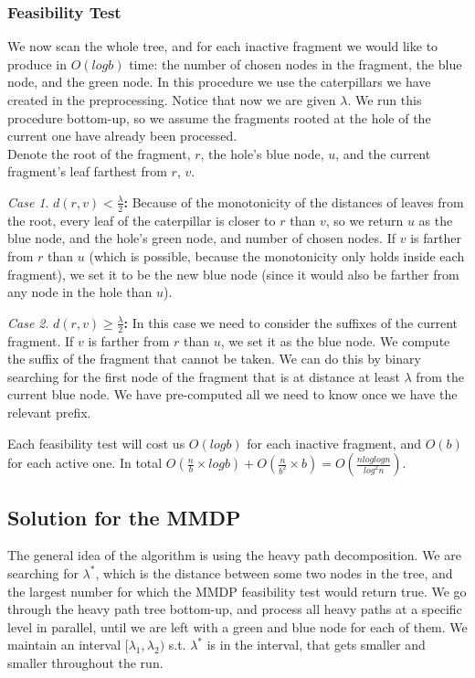 \documentclass[11pt,a4paper]{article}
\theoremstyle{definition}
\theoremstyle{remark}
\newtheorem{case}{Case}
\begin{document}
\subsubsection{Feasibility Test}
We now scan the whole tree, and for each inactive fragment we would like to produce in $O(logb)$ time: the number of chosen nodes in the fragment, the blue node, and the green node. In this procedure we use the caterpillars we have created in the preprocessing. Notice that now we are given $\lambda$.
We run this procedure bottom-up, so we assume the fragments rooted at the hole of the current one have already been processed.\\
Denote the root of the fragment, $r$, the hole's blue node, $u$, and the current fragment's leaf farthest from $r$, $v$.\\
\begin{case}
\textbf{$d(r,v) < \frac{\lambda}{2}$:} Because of the monotonicity of the distances of leaves from the root, every leaf of the caterpillar is closer to $r$ than $v$, so we return $u$ as the blue node, and the hole's green node, and number of chosen nodes. If $v$ is farther from $r$ than $u$ (which is possible, because the monotonicity only holds inside each fragment), we set it to be the new blue node (since it would also be farther from any node in the hole than $u$).
\end{case}
\begin{case}
\textbf{$d(r,v) \geq \frac{\lambda}{2}$:}
In this case we need to consider the suffixes of the current fragment. If $v$ is farther from $r$ than $u$, we set it as the blue node. We compute the suffix of the fragment that cannot be taken. We can do this by binary searching for the first node of the fragment that is at distance at least $\lambda$ from the current blue node. We have pre-computed all we need to know once we have the relevant prefix.
\end{case}
Each feasibility test will cost us $O(logb)$ for each inactive fragment, and $O(b)$ for each active one. In total $O(\frac{n}{b} \times logb) + O(\frac{n}{b^2} \times b) = O(\frac{nloglogn}{log^2n})$.


\subsection{Solution for the MMDP}
The general idea of the algorithm is using the heavy path decomposition. We are searching for $\lambda^*$, which is the distance between some two nodes in the tree, and the largest number for which the MMDP feasibility test would return true.
We go through the heavy path tree bottom-up, and process all heavy paths at a specific level in parallel, until we are left with a green and blue node for each of them. We maintain an interval $[\lambda_1,\lambda_2)$ s.t. $\lambda^*$ is in the interval, that gets smaller and smaller throughout the run.
\end{document}

